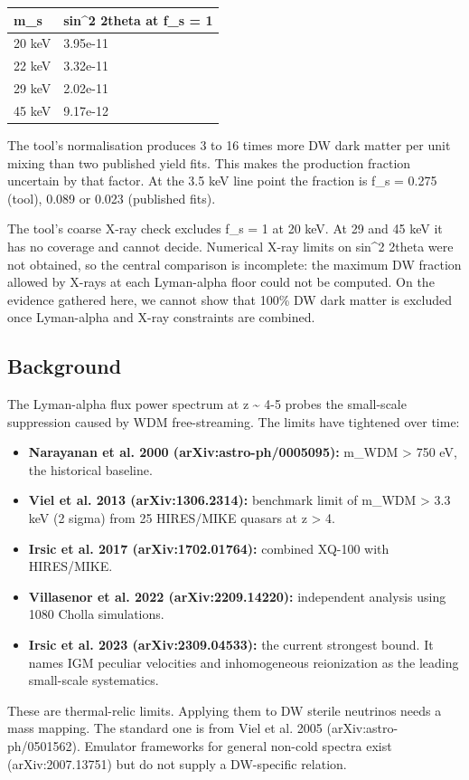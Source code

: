 \documentclass[11pt,a4paper]{article}
\begin{document}
\begin{longtable}{@{}p{}p{}@{}}
\toprule
\textbf{m\_s} & \textbf{sin\textasciicircum{}2 2theta at f\_s = 1} \\ \midrule \endhead
20 keV & 3.95e-11 \\
22 keV & 3.32e-11 \\
29 keV & 2.02e-11 \\
45 keV & 9.17e-12 \\
\bottomrule\end{longtable}
The tool's normalisation produces 3 to 16 times more DW dark matter per unit mixing than two published yield fits. This makes the production fraction uncertain by that factor. At the 3.5 keV line point the fraction is f\_s = 0.275 (tool), 0.089 or 0.023 (published fits).

The tool's coarse X-ray check excludes f\_s = 1 at 20 keV. At 29 and 45 keV it has no coverage and cannot decide. Numerical X-ray limits on sin\textasciicircum{}2 2theta were not obtained, so the central comparison is incomplete: the maximum DW fraction allowed by X-rays at each Lyman-alpha floor could not be computed. On the evidence gathered here, we cannot show that 100\% DW dark matter is excluded once Lyman-alpha and X-ray constraints are combined.

\subsection{Background}
The Lyman-alpha flux power spectrum at z \textasciitilde{} 4-5 probes the small-scale suppression caused by WDM free-streaming. The limits have tightened over time:

\begin{itemize}
  \item \textbf{Narayanan et al. 2000 (arXiv:astro-ph/0005095):} m\_WDM \textgreater{} 750 eV, the historical baseline.
  \item \textbf{Viel et al. 2013 (arXiv:1306.2314):} benchmark limit of m\_WDM \textgreater{} 3.3 keV (2 sigma) from 25 HIRES/MIKE quasars at z \textgreater{} 4.
  \item \textbf{Irsic et al. 2017 (arXiv:1702.01764):} combined XQ-100 with HIRES/MIKE.
  \item \textbf{Villasenor et al. 2022 (arXiv:2209.14220):} independent analysis using 1080 Cholla simulations.
  \item \textbf{Irsic et al. 2023 (arXiv:2309.04533):} the current strongest bound. It names IGM peculiar velocities and inhomogeneous reionization as the leading small-scale systematics.
\end{itemize}
These are thermal-relic limits. Applying them to DW sterile neutrinos needs a mass mapping. The standard one is from Viel et al. 2005 (arXiv:astro-ph/0501562). Emulator frameworks for general non-cold spectra exist (arXiv:2007.13751) but do not supply a DW-specific relation.
\end{document}

